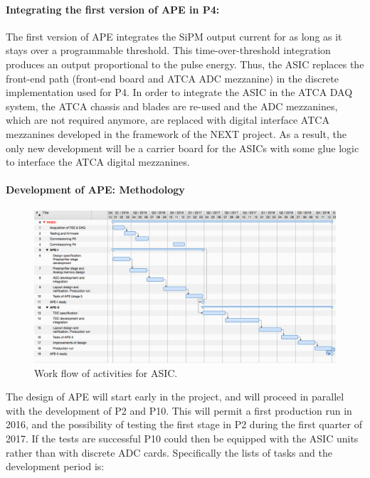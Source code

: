 \paragraph{Integrating the first version of APE in P4:}
The first version of APE integrates the SiPM output current for as long as it stays over a programmable threshold. This time-over-threshold integration produces an output proportional to the pulse energy. 
Thus, the ASIC replaces the front-end path (front-end board and ATCA ADC mezzanine) in the discrete implementation used for P4. In order to integrate the ASIC in the ATCA DAQ system, the ATCA chassis and blades are re-used and the ADC mezzanines, which are not required anymore, are replaced with digital interface ATCA mezzanines developed in the framework of the NEXT project. As a result, the only new development will be a carrier board for the ASICs with some glue logic to interface the ATCA digital mezzanines.
 
 \paragraph{Development of APE: Methodology}
 
 \begin{figure}[!htb]
	\centering
	\includegraphics[scale=0.4]{img/ASICWF.png}
	\caption{\label{fig.ASICWF} Work flow of activities for ASIC.  }
\end{figure}

 
The design of APE will start early in the project, and will proceed in parallel with the development of P2 and P10. This will permit a first production run in 2016, and the possibility of testing the first stage in P2 during the first quarter of 2017. If the tests are successful P10 could then be equipped with the ASIC units rather than with discrete ADC cards. Specifically the lists of tasks and the development period is:

